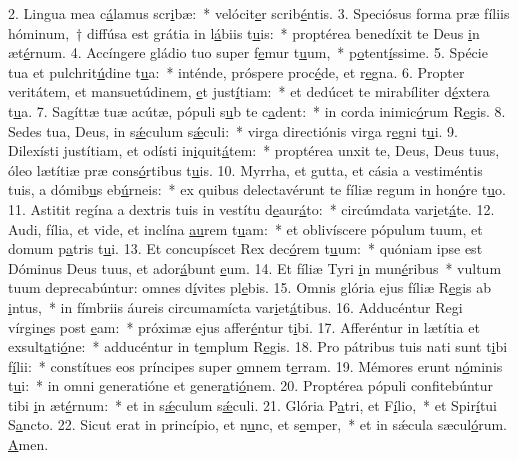 2. Lingua mea c\uline{á}lamus scr\uline{i}bæ:~* velócit\uline{e}r scrib\uline{é}ntis.
3. Speciósus forma præ fíliis hóminum,~† diffúsa est grátia in l\uline{á}biis t\uline{u}is:~* proptérea benedíxit te Deus \uline{i}n æt\uline{é}rnum.
4. Accíngere gládio tuo super f\uline{e}mur t\uline{u}um,~* p\uline{o}tent\uline{í}ssime.
5. Spécie tua et pulchrit\uline{ú}dine t\uline{u}a:~* inténde, próspere proc\uline{é}de, et r\uline{e}gna.
6. Propter veritátem, et mansuetúdinem, \uline{e}t just\uline{í}tiam:~* et dedúcet te mirabíliter d\uline{é}xtera t\uline{u}a.
7. Sagíttæ tuæ acútæ, pópuli s\uline{u}b te c\uline{a}dent:~* in corda inimic\uline{ó}rum R\uline{e}gis.
8. Sedes tua, Deus, in s\uline{ǽ}culum s\uline{ǽ}culi:~* virga directiónis virga r\uline{e}gni t\uline{u}i.
9. Dilexísti justítiam, et odísti in\uline{i}quit\uline{á}tem:~* proptérea unxit te, Deus, Deus tuus, óleo lætítiæ præ cons\uline{ó}rtibus t\uline{u}is.
10. Myrrha, et gutta, et cásia a vestiméntis tuis, a dómib\uline{u}s eb\uline{ú}rneis:~* ex quibus delectavérunt te fíliæ regum in hon\uline{ó}re t\uline{u}o.
11. Astitit regína a dextris tuis in vestítu d\uline{e}aur\uline{á}to:~* circúmdata var\uline{i}et\uline{á}te.
12. Audi, fília, et vide, et inclína \uline{au}rem t\uline{u}am:~* et oblivíscere pópulum tuum, et domum p\uline{a}tris t\uline{u}i.
13. Et concupíscet Rex dec\uline{ó}rem t\uline{u}um:~* quóniam ipse est Dóminus Deus tuus, et ador\uline{á}bunt \uline{e}um.
14. Et fíliæ Tyri \uline{i}n mun\uline{é}ribus~* vultum tuum deprecabúntur: omnes d\uline{í}vites pl\uline{e}bis.
15. Omnis glória ejus fíliæ R\uline{e}gis ab \uline{i}ntus,~* in fímbriis áureis circumamícta var\uline{i}et\uline{á}tibus.
16. Adducéntur Regi vírgin\uline{e}s post \uline{e}am:~* próximæ ejus affer\uline{é}ntur t\uline{i}bi.
17. Afferéntur in lætítia et exsult\uline{a}ti\uline{ó}ne:~* adducéntur in t\uline{e}mplum R\uline{e}gis.
18. Pro pátribus tuis nati sunt t\uline{i}bi f\uline{í}lii:~* constítues eos príncipes super \uline{o}mnem t\uline{e}rram.
19. Mémores erunt n\uline{ó}minis t\uline{u}i:~* in omni generatióne et gener\uline{a}ti\uline{ó}nem.
20. Proptérea pópuli confitebúntur tibi \uline{i}n æt\uline{é}rnum:~* et in s\uline{ǽ}culum s\uline{ǽ}culi.
21. Glória P\uline{a}tri, et F\uline{í}lio,~* et Spir\uline{í}tui S\uline{a}ncto.
22. Sicut erat in princípio, et n\uline{u}nc, et s\uline{e}mper,~* et in sǽcula sæcul\uline{ó}rum. \uline{A}men.
